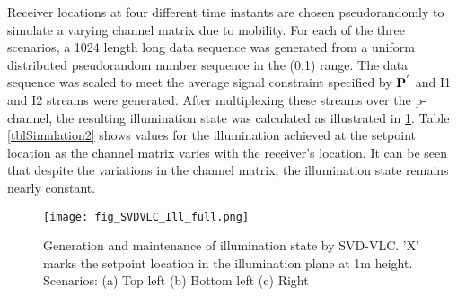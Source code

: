 Receiver locations at four different time instants are chosen pseudorandomly to simulate a varying channel matrix due to mobility. For each of the three scenarios, a 1024 length long data sequence was generated from a uniform distributed pseudorandom number sequence in the (0,1) range. The data sequence was scaled to meet the average signal constraint specified by ${\bf{P}}^{'}$ and I1 and I2 streams were generated. After multiplexing these streams over the p-channel, the resulting illumination state was calculated as illustrated in \figurename{ \ref{figIllSVD}}. Table \ref{tblSimulation2} shows values for the illumination achieved at the setpoint location as the channel matrix varies with the receiver's location. It can be seen that despite the variations in the channel matrix, the illumination state remains nearly constant.

\begin{figure}[!t]
	\centering
		\texttt{[image: fig\_SVDVLC\_Ill\_full.png]}
	\caption[Generation and maintenance of illumination state by SVD-VLC]{Generation and maintenance of illumination state by SVD-VLC. 'X' marks the setpoint location in the illumination plane at 1m height. Scenarios: (a) Top left (b) Bottom left (c) Right }
	\label{figIllSVD}
\end{figure}

